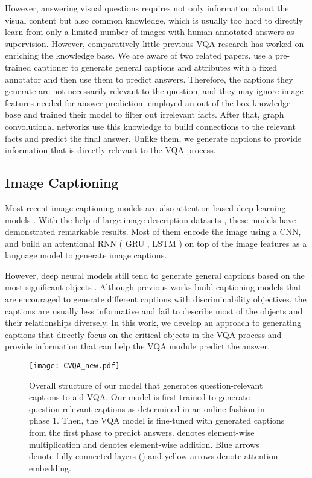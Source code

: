 \documentclass[11pt,a4paper]{article}
\begin{document}
However, answering visual questions requires not only information about the visual content but also common knowledge, which is usually too hard to directly learn from only a limited number of images with human annotated answers as supervision. However, comparatively little previous VQA research has worked on enriching the knowledge base. We are aware of two related papers.  use a pre-trained captioner to generate general captions and attributes with a fixed annotator and then use them to predict answers. Therefore, the captions they generate are not necessarily relevant to the question, and they may ignore image features needed for answer prediction.  employed an out-of-the-box knowledge base and trained their model to filter out irrelevant facts. After that, graph convolutional networks use this knowledge to build connections to the relevant facts and predict the final answer. Unlike them, we generate captions to provide information that is directly relevant to the VQA process. 
\subsection{Image Captioning}
Most recent image captioning models are also attention-based deep-learning models  \cite{donahue2015long,karpathy2015deep,vinyals2015show,Luo_2018_CVPR,liu2018show}. With the help of large image description datasets \cite{chen2015microsoft}, these models have demonstrated remarkable results. Most of them encode the image using a CNN, and build an attentional RNN ( GRU \cite{cho2014learning}, LSTM \cite{hochreiter1997long}) on top of the image features as a language model to generate image captions. 

However, deep neural models still tend to generate general captions based on the most significant objects \cite{vijayakumar2016diverse}. Although previous works \cite{Luo_2018_CVPR,liu2018show} build captioning models that are encouraged to generate different captions with discriminability objectives, the captions are usually less informative and fail to describe most of the objects and their relationships diversely. In this work, we develop an approach to generating captions that directly focus on the critical objects in the VQA process and provide information that can help the VQA module predict the answer.
\begin{figure*}[!t]
\centering
\texttt{[image: CVQA\_new.pdf]}
\caption{Overall structure of our model that generates question-relevant captions to aid VQA. Our model is first trained to generate question-relevant captions as determined in an online fashion in phase 1. Then, the VQA model is fine-tuned with generated captions from the first phase to predict answers. 
 denotes element-wise multiplication and  denotes element-wise addition. Blue arrows denote fully-connected layers () and yellow arrows denote attention embedding.}
\label{fig:overall_structure}
\end{figure*}
\end{document}
